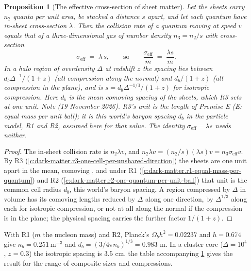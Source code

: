 \documentclass[11pt]{article}
\newtheorem{proposition}[theorem]{Proposition}
\theoremstyle{definition}
\theoremstyle{plain}
\newcommand{\changedmark}[2]{\marginpar{\raggedright\scriptsize\color{#1}#2}}
\begin{document}
\begin{proposition}[The effective cross-section of sheet matter]\label{c:simulations.effective-cross-section-sheet-matter}
\changedmark{BurntOrange}{changed since the deposit}
Let the sheets carry $n_{2}$ quanta per unit area, be stacked a distance $s$ apart, and let each quantum have in-sheet cross-section $\lambda$. Then the collision rate of a quantum moving at speed $v$ equals that of a three-dimensional gas of number density $n_{3} = n_{2}/s$ with cross-section
\[
\sigma_{\mathrm{eff}} \;=\; \lambda\, s ,
\qquad\text{so}\qquad
\frac{\sigma_{\mathrm{eff}}}{m} \;=\; \frac{\lambda s}{m}.
\]
In a halo region of overdensity $\Delta$ at redshift $z$ the spacing lies between $d_{b}\Delta^{-1}/(1+z)$ (all compression along the normal) and $d_{b}/(1+z)$ (all compression in the plane), and is $s = d_{b}\Delta^{-1/3}/(1+z)$ for isotropic compression. Here $d_{b}$ is the mean comoving spacing of the sheets, which R3 sets at one unit. \emph{Note (19 November 2026).} R3's unit is the length of Premise E (\emph{E: equal mass per unit ball}); it is this world's baryon spacing $d_{b}$ in the particle model, R1 and R2, assumed here for that value. The identity $\sigma_{\mathrm{eff}} = \lambda s$ needs neither.
\end{proposition}
\begin{proof}
The in-sheet collision rate is $n_{2}\lambda v$, and $n_{2}\lambda v = (n_{2}/s)(\lambda s)v = n_{3}\sigma_{\mathrm{eff}}v$. By R3 (\ref{c:dark-matter.r3-one-cell-per-unshared-direction}) the sheets are one unit apart in the mean, comoving \cite[Prem.~7.4]{ButlerT14}, and under R1 (\ref{c:dark-matter.r1-equal-mass-per-quantum}) and R2 (\ref{c:dark-matter.r2-one-quantum-per-unit-ball}) that unit is the common cell radius $d_{b}$, this world's baryon spacing. A region compressed by $\Delta$ in volume has its comoving lengths reduced by $\Delta$ along one direction, by $\Delta^{1/3}$ along each for isotropic compression, or not at all along the normal if the compression is in the plane; the physical spacing carries the further factor $1/(1+z)$.

\end{proof}

\label{c:note.simulations.setting-effective-cross-section-2}
With R1 ($m$ the nucleon mass) and R2, Planck's $\Omega_{b}h^{2} = 0.02237$ and $h = 0.674$ give $n_{b} = 0.251\ \mathrm{m^{-3}}$ and $d_{b} = (3/4\pi n_{b})^{1/3} = 0.983$ m. In a cluster core ($\Delta = 10^{4}$, $z = 0.3$) the isotropic spacing is $3.5$ cm. the table accompanying \ref{c:simulations.effective-cross-section-sheet-matter} gives the result for the range of composite sizes and compressions.
\end{document}

